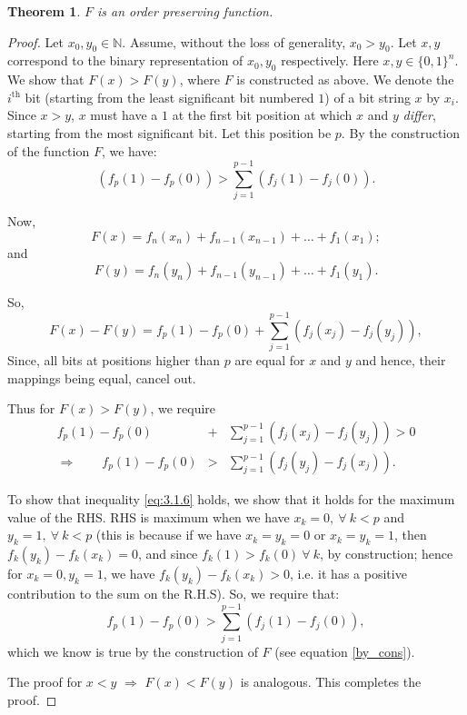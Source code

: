\documentclass[11pt, letterpaper, romanappendices, onecolumn]{article}
\theoremstyle{plain}\newtheorem{thm}{Theorem}[section]
\theoremstyle{definition}
\theoremstyle{remark}
\begin{document}
\begin{thm}\label{ope}
$F$ is an order preserving function.
\end{thm}
\begin{proof}
Let $x_0,y_0\in\mathbb{N}$. Assume, without the loss of generality, $x_0 > y_0$. Let $x,y$ correspond to the binary representation of $x_0,y_0$ respectively. Here $x,y \in \lbrace0,1\rbrace^n$. We show that $F(x) > F(y)$, where $F$ is constructed as above. We denote the $i^\text{th}$ bit (starting from the least significant bit numbered $1$) of a bit string $x$ by $x_i$. Since $x > y$, $x$ must have a $1$ at the first bit position at which $x$ and $y$ \textit{differ}, starting from the most significant bit. Let this position be $p$. By the construction of the function $F$, we have:
\begin{equation}
(f_p(1)- f_p(0)) > \displaystyle\sum\limits^{p-1}_{j=1}(f_j(1)-f_j(0)).	\label{by_cons}
\end{equation}

\par Now,
\[
	F(x) = f_n(x_n) + f_{n-1}(x_{n-1}) + \ldots + f_1(x_1);
\]
and 
\[
	F(y) = f_n(y_n) + f_{n-1}(y_{n-1}) + \ldots + f_1(y_1).
\]

So,
\[
	F(x) - F(y) = f_p(1)-f_p(0) + \displaystyle\sum\limits_{j=1}^{p-1}(f_j(x_j) - f_j(y_j)),
\]
Since, all bits at positions higher than $p$ are equal for $x$ and $y$ and hence, their mappings being equal, cancel out.

\par Thus for $F(x) > F(y)$, we require
\begin{eqnarray}
	f_p(1)-f_p(0) &+& \displaystyle\sum\limits_{j=1}^{p-1}(f_j(x_j) - f_j(y_j)) > 0 \\
	\Rightarrow \qquad f_p(1)-f_p(0) &>& \displaystyle\sum\limits_{j=1}^{p-1}(f_j(y_j) - f_j(x_j)). \label{eq:3.1.6}
\end{eqnarray}

To show that inequality \eqref{eq:3.1.6} holds, we show that it holds for the maximum value of the RHS. RHS is maximum when we have $x_k = 0,~\forall~k < p$ and $y_k = 1,~\forall~k < p$ (this is because if we have $x_k=y_k=0$ or $x_k=y_k=1$, then $f_k(y_k)-f_k(x_k)=0$, and since $f_k(1) > f_k(0) ~\forall~k$, by construction; hence for $x_k=0,y_k=1$, we have $f_k(y_k)-f_k(x_k)>0$, i.e. it has a positive contribution to the sum on the R.H.S). So, we require that:
\[
f_p(1)- f_p(0) > \displaystyle\sum\limits^{p-1}_{j=1}(f_j(1)-f_j(0)),
\]
which we know is true by the construction of $F$ (see equation \eqref{by_cons}).

The proof for $x<y$ $\Longrightarrow$ $F(x)<F(y)$ is analogous. This completes the proof. 
\end{proof}
\end{document}
